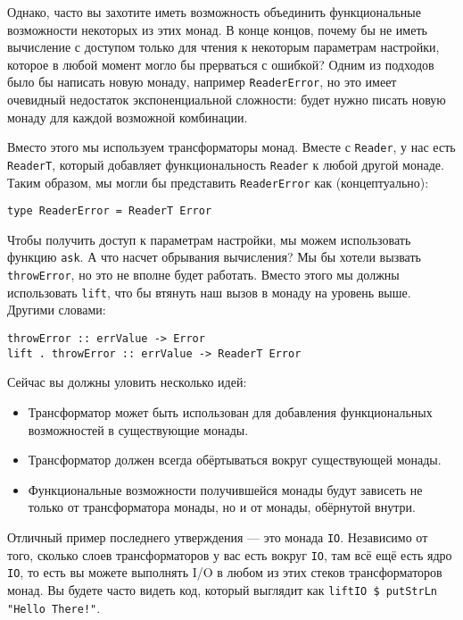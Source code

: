 Однако, часто вы захотите иметь возможность объединить функциональные возможности 
некоторых из этих монад. В конце концов, почему бы не иметь вычисление с доступом только
для чтения к некоторым параметрам настройки, которое в любой момент могло бы прерваться с
ошибкой? Одним из подходов было бы написать новую монаду, например
\lstinline'ReaderError', но это имеет очевидный недостаток экспоненциальной сложности:
будет нужно писать новую монаду для каждой возможной комбинации.

Вместо этого мы используем трансформаторы монад. Вместе с \lstinline'Reader', у нас есть
\lstinline'ReaderT', который добавляет функциональность \lstinline'Reader' к любой другой
монаде. Таким образом, мы могли бы представить \lstinline'ReaderError' как
(концептуально):

\begin{lstlisting}
type ReaderError = ReaderT Error
\end{lstlisting}

Чтобы получить доступ к параметрам настройки, мы можем использовать функцию
\lstinline'ask'. А что насчет обрывания вычисления? Мы бы хотели вызвать
\lstinline'throwError', но это не вполне будет работать. Вместо этого мы должны
использовать \lstinline'lift', что бы втянуть наш вызов в монаду на уровень выше. Другими
словами:

\begin{lstlisting}
throwError :: errValue -> Error
lift . throwError :: errValue -> ReaderT Error
\end{lstlisting}
  
Сейчас вы должны уловить несколько идей:
\begin{itemize}
\item  Трансформатор может быть использован для добавления функциональных возможностей в
существующие монады.
\item  Трансформатор должен всегда обёртываться вокруг существующей монады.
\item  Функциональные возможности получившейся монады будут зависеть не только от
трансформатора монады, но и от монады, обёрнутой внутри.
\end{itemize}

Отличный пример последнего утверждения --- это монада \lstinline'IO'. Независимо от того,
сколько слоев трансформаторов у вас есть вокруг \lstinline'IO', там всё ещё есть ядро
\lstinline'IO', то есть вы можете выполнять I/O в любом из этих стеков трансформаторов
монад. Вы будете часто видеть код, который выглядит как 
\lstinline'liftIO $ putStrLn "Hello There!"'.

